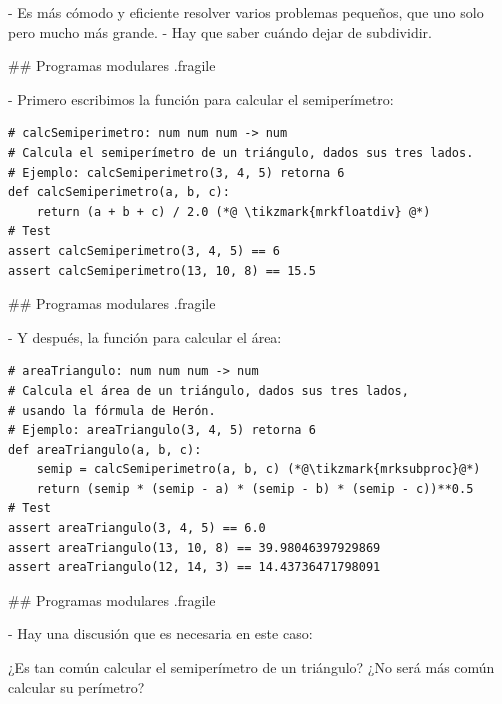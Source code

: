 - Es más cómodo y eficiente resolver varios problemas pequeños, que uno solo pero mucho más grande.
- Hay que saber cuándo dejar de subdividir.


## Programas modulares {.fragile}


- Primero escribimos la función para calcular el semiperímetro:

\begin{lstlisting}
# calcSemiperimetro: num num num -> num
# Calcula el semiperímetro de un triángulo, dados sus tres lados.
# Ejemplo: calcSemiperimetro(3, 4, 5) retorna 6
def calcSemiperimetro(a, b, c):
    return (a + b + c) / 2.0 (*@ \tikzmark{mrkfloatdiv} @*)
# Test
assert calcSemiperimetro(3, 4, 5) == 6
assert calcSemiperimetro(13, 10, 8) == 15.5
\end{lstlisting}

\pause


## Programas modulares {.fragile}


- Y después, la función para calcular el área:

\begin{lstlisting}
# areaTriangulo: num num num -> num
# Calcula el área de un triángulo, dados sus tres lados,
# usando la fórmula de Herón.
# Ejemplo: areaTriangulo(3, 4, 5) retorna 6
def areaTriangulo(a, b, c):
    semip = calcSemiperimetro(a, b, c) (*@\tikzmark{mrksubproc}@*)
    return (semip * (semip - a) * (semip - b) * (semip - c))**0.5
# Test
assert areaTriangulo(3, 4, 5) == 6.0
assert areaTriangulo(13, 10, 8) == 39.98046397929869
assert areaTriangulo(12, 14, 3) == 14.43736471798091
\end{lstlisting}

\pause


## Programas modulares {.fragile}


- Hay una discusión que es necesaria en este caso:

\bgnblocknormal
¿Es tan común calcular el semiperímetro de un triángulo?  \newline
¿No será más común calcular su perímetro?
\trmblocknormal

